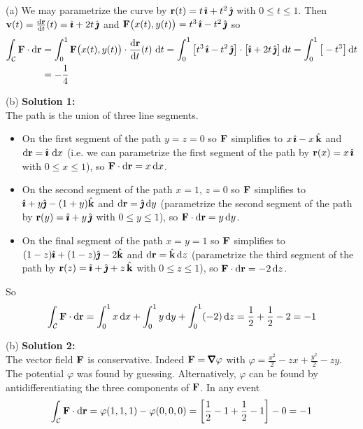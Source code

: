 \begin{solution}
(a) 
We may parametrize the curve by $\mathbf{r}(t)=t\,\hat{\pmb{\imath}}+t^2\,\hat{\pmb{\jmath}}$ with $0\le t\le 1$.
Then $\vv(t)=\diff{\vr}{t}(t)=\hi+2t\,\hj$ and 
$\mathbf{F}\big(x(t),y(t)\big)=t^3\,\hat{\pmb{\imath}}-t^2\,\hat{\pmb{\jmath}}$ so
\begin{align*}
\int_\cC\vF\cdot \dee{\vr}
&=\int_0^1 \vF\big(x(t),y(t)\big)\cdot \diff{\vr}{t}(t)\ \dee{t}
=\int_0^1\big[t^3\,\hi-t^2\,\hj\big]
\cdot\big[\hi+2t\,\hj\big]\,\dee{t}
=\int_0^1\big[-t^3\big]\,\dee{t} \\
&=-\frac{1}{4}
\end{align*}

(b) \textbf{Solution 1:}\\ 
The path is the union of three line segments.
\begin{itemize}\itemsep1pt \parskip0pt  %
\item
On the first segment of the path $y=z=0$ so $\mathbf{F}$ simplifies
to $x\,\hat{\pmb{\imath}}-x\,\hat{\mathbf{k}}$ and $\mathrm{d}\mathbf{r}=\hat{\pmb{\imath}}\ \mathrm{d}x$ (i.e. we can parametrize
the first segment of the path by $\mathbf{r}(x)=x\,\hat{\pmb{\imath}}$ with $0\le x\le 1$),
so $\mathbf{F}\cdot \mathrm{d}\mathbf{r}=x\,\mathrm{d}x$. 
\item
On the second segment of the path $x=1$, $z=0$ so $\mathbf{F}$ simplifies
to $\hat{\pmb{\imath}}+y\hat{\pmb{\jmath}}-(1+y)\hat{\mathbf{k}}$ and $\mathrm{d}\mathbf{r}=\hat{\pmb{\jmath}}\, \mathrm{d}y$
(parametrize the second segment of the path by $
\mathbf{r}(y)=\hat{\pmb{\imath}}+y\,\hat{\pmb{\jmath}}$ with $0\le y\le 1$),
so $\mathbf{F}\cdot \mathrm{d}\mathbf{r}=y\,\mathrm{d}y$.
\item
On the final segment of the path $x=y=1$ so $\mathbf{F}$ simplifies
to $(1-z)\hat{\pmb{\imath}}+(1-z)\hat{\pmb{\jmath}}-2\hat{\mathbf{k}}$ and $\mathrm{d}\mathbf{r}=\hat{\mathbf{k}}\, \mathrm{d}z$
(parametrize the third segment of the path by $
\mathbf{r}(z)=\hat{\pmb{\imath}}+\hat{\pmb{\jmath}}+z\,\hat{\mathbf{k}}$ with $0\le z\le 1$),
so $\mathbf{F}\cdot \mathrm{d}\mathbf{r}=-2\,\mathrm{d}z$.
\end{itemize}
So
\begin{equation*}
\int_{\mathcal{C}}\mathbf{F}\cdot \mathrm{d}\mathbf{r}=\int_0^1 x\,\mathrm{d}x
           +\int_0^1 y\,\mathrm{d}y+\int_0^1(-2)\,\mathrm{d}z
=\frac{1}{2}+\frac{1}{2}-2
=-1
\end{equation*}

(b) \textbf{Solution 2:}\\ 
The vector field $\mathbf{F}$ is conservative. Indeed $\vF=\vnabla\varphi$ with
$\varphi =  \frac{x^2}{2}-zx +\frac{y^2}{2} -zy$. The potential $\varphi$ 
was found by guessing. Alternatively, $\varphi$ can be found 
by antidifferentiating the three components of $\mathbf{F}$. In any event
\begin{equation*}
\int_{\mathcal{C}}\mathbf{F}\cdot \mathrm{d}\mathbf{r}=\varphi(1,1,1) -\varphi(0,0,0)
=\left[\frac{1}{2}-1 +\frac{1}{2} -1\right] - 0
=-1
\end{equation*}


\end{solution}

